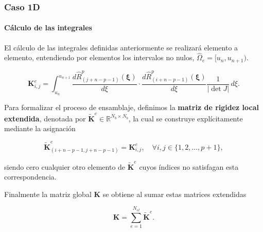 \documentclass[compress]{beamer}
\begin{document}
\begin{frame}
	\frametitle{Caso 1D}
	\framesubtitle{Cálculo de las integrales}
	\tiny

	El cálculo de las integrales definidas anteriormente se realizará elemento a elemento, entendiendo por elementos los intervalos no nulos, $\hat{\Omega}_e=[u_n, u_{n+1})$.

	\begin{definition}
		\begin{equation*}
			\mathbf{K}_{i,j}^e=\int_{u_n}^{u_{n+1}} \frac{d\hat{R}_{(j+ n - p - 1)}^p(\boldsymbol{\xi})}{d\xi}\cdot \frac{d\hat{R}_{(i+ n - p - 1)}^p(\boldsymbol{\xi})}{d\xi} \frac{1}{|\det J|} \, d\xi.
		\end{equation*}
	\end{definition}

	\begin{definition}
		Para formalizar el proceso de ensamblaje, definimos la \textbf{matriz de rigidez local extendida}, denotada por $\tilde{\mathbf{K}}^e \in \mathbb{R}^{N_b \times N_b}$, la cual se construye explícitamente mediante la asignación

		\begin{equation*}
			\tilde{\mathbf{K}}^e_{(i + n - p - 1,  j + n - p - 1)} = \mathbf{K}_{i,j}^e,\quad \forall i,j \in \{1,2, \dots, p+1\},
		\end{equation*}

		siendo cero cualquier otro elemento de $\tilde{\mathbf{K}}^e$ cuyos índices no satisfagan esta correspondencia.
	\end{definition}

	\begin{definition}
		Finalmente la matriz global $\mathbf{K}$ se obtiene al sumar estas matrices extendidas
		
		\vspace{-5pt}
		\begin{equation*}
			\mathbf{K} = \sum_{e=1}^{N_{el}} \tilde{\mathbf{K}}^e.
		\end{equation*}
	\end{definition}
\end{frame}
\end{document}
